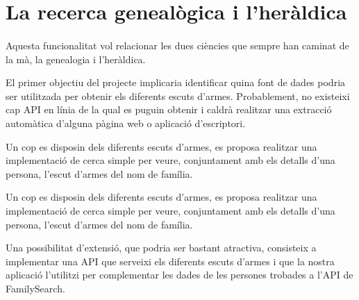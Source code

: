 \section{La recerca genealògica i l'heràldica}

    \paragraph{}
    Aquesta funcionalitat vol relacionar les dues ciències que sempre han caminat de la mà, la genealogia i l'heràldica.

    El primer objectiu del projecte implicaria identificar quina font de dades podria ser utilitzada per obtenir els diferents escuts d'armes. Probablement, no existeixi cap API en línia de la qual es puguin obtenir i caldrà realitzar una extracció automàtica d'alguna pàgina web o aplicació d'escriptori.

    Un cop es disposin dels diferents escuts d'armes, es proposa realitzar una implementació de cerca simple per veure, conjuntament amb els detalls d'una persona, l'escut d'armes del nom de família.

    Un cop es disposin dels diferents escuts d'armes, es proposa realitzar una implementació de cerca simple per veure, conjuntament amb els detalls d'una persona, l'escut d'armes del nom de família.

    Una possibilitat d'extensió, que podria ser bastant atractiva, consisteix a implementar una API que serveixi els diferents escuts d'armes i que la nostra aplicació l'utilitzi per complementar les dades de les persones trobades a l'API de FamilySearch.
